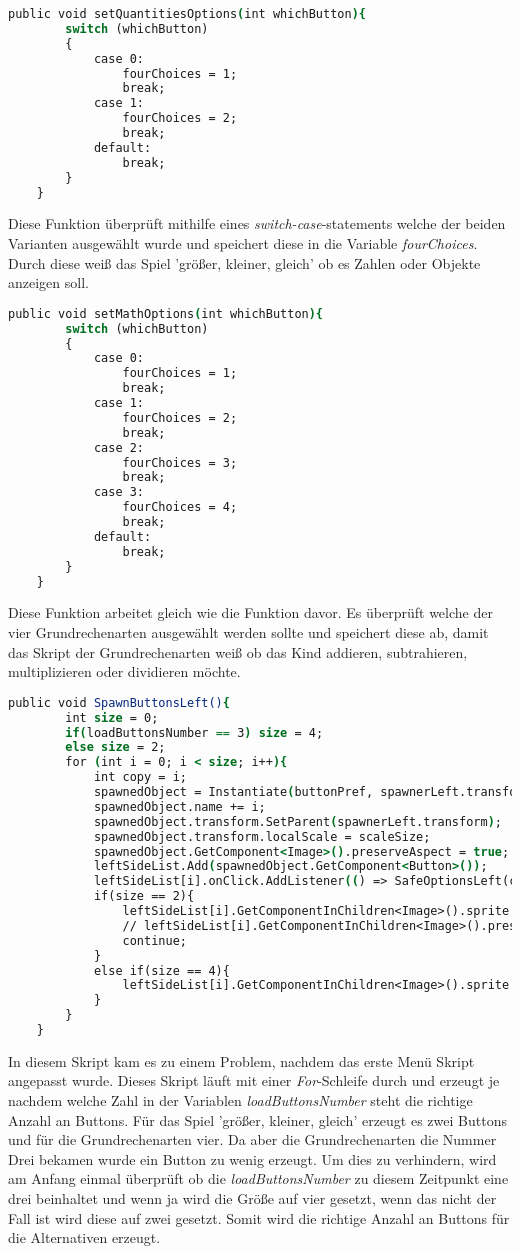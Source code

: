 \begin{lstlisting}[language=csh, caption={MenuPickLevelAdvanced.cs setQuantitiesOptions-Funktion}]
	public void setQuantitiesOptions(int whichButton){
		switch (whichButton)
		{
			case 0:
				fourChoices = 1;
				break;
			case 1:
				fourChoices = 2;
				break;
			default:
				break;
		}
	}
\end{lstlisting}
Diese Funktion überprüft mithilfe eines \textit{switch-case}-statements welche der beiden Varianten ausgewählt wurde und speichert diese in die Variable \textit{fourChoices}. Durch diese weiß das Spiel 'größer, kleiner, gleich' ob es Zahlen oder Objekte anzeigen soll.
\begin{lstlisting}[language=csh, caption={MenuPickLevelAdvanced.cs setMathOptions-Funktion}]
	public void setMathOptions(int whichButton){
		switch (whichButton)
		{
			case 0:
				fourChoices = 1;
				break;
			case 1:
				fourChoices = 2;
				break;
			case 2:
				fourChoices = 3;
				break;
			case 3:
				fourChoices = 4;
				break;
			default:
				break;
		}
	}
\end{lstlisting}
Diese Funktion arbeitet gleich wie die Funktion davor. Es überprüft welche der vier Grundrechenarten ausgewählt werden sollte und speichert diese ab, damit das Skript der Grundrechenarten weiß ob das Kind addieren, subtrahieren, multiplizieren oder dividieren möchte.
\begin{lstlisting}[language=csh, caption={MenuPickLevelAdvanced.cs SpawnButtonsLeft-Funktion}]
	public void SpawnButtonsLeft(){
		int size = 0;
		if(loadButtonsNumber == 3) size = 4;
		else size = 2;
		for (int i = 0; i < size; i++){
			int copy = i;
			spawnedObject = Instantiate(buttonPref, spawnerLeft.transform.position, Quaternion.identity);
			spawnedObject.name += i;
			spawnedObject.transform.SetParent(spawnerLeft.transform);
			spawnedObject.transform.localScale = scaleSize;
			spawnedObject.GetComponent<Image>().preserveAspect = true;
			leftSideList.Add(spawnedObject.GetComponent<Button>());
			leftSideList[i].onClick.AddListener(() => SafeOptionsLeft(copy));
			if(size == 2){
				leftSideList[i].GetComponentInChildren<Image>().sprite = quantitiesModes[i];
				// leftSideList[i].GetComponentInChildren<Image>().preserveAspect = true;
				continue;
			}
			else if(size == 4){
				leftSideList[i].GetComponentInChildren<Image>().sprite = mathModes[i];
			}
		}
	}
\end{lstlisting}
In diesem Skript kam es zu einem Problem, nachdem das erste Menü Skript angepasst wurde. Dieses Skript läuft mit einer \textit{For}-Schleife durch und erzeugt je nachdem welche Zahl in der Variablen \textit{loadButtonsNumber} steht die richtige Anzahl an Buttons. Für das Spiel 'größer, kleiner, gleich' erzeugt es zwei Buttons und für die Grundrechenarten vier. Da aber die Grundrechenarten die Nummer Drei bekamen wurde ein Button zu wenig erzeugt. Um dies zu verhindern, wird am Anfang einmal überprüft ob die \textit{loadButtonsNumber} zu diesem Zeitpunkt eine drei beinhaltet und wenn ja wird die Größe auf vier gesetzt, wenn das nicht der Fall ist wird diese auf zwei gesetzt. Somit wird die richtige Anzahl an Buttons für die Alternativen erzeugt.\\
